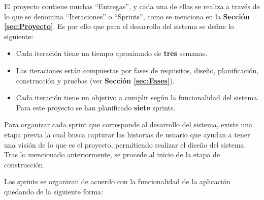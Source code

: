 El proyecto contiene muchas ``Entregas'', y cada una de ellas se realiza a través de lo que se denomina ``Iteraciones'' o ``Sprints'', como se menciona en la \textbf{Sección \ref{sec:Proyecto}}. Es por ello que para el desarrollo del sistema se define lo siguiente:

\begin{itemize}
    \item Cada iteración tiene un tiempo aproximado de \textbf{tres} semanas.
    \item Las iteraciones están compuestas por fases de requisitos, diseño, planificación, construcción y pruebas (ver \textbf{Sección \ref{sec:Fases}}).
    \item Cada iteración tiene un objetivo a cumplir según la funcionalidad del sistema. Para este proyecto se han planificado \textbf{siete} sprints.
\end{itemize}

Para organizar cada sprint que corresponde al desarrollo del sistema, existe una etapa previa la cual busca capturar las historias de usuario que ayudan a tener una visión de lo que es el proyecto, permitiendo realizar el diseño del sistema. Tras lo mencionado anteriormente, se procede al inicio de la etapa de construcción.

Los sprints se organizan de acuerdo con la funcionalidad de la aplicación quedando de la siguiente forma:

